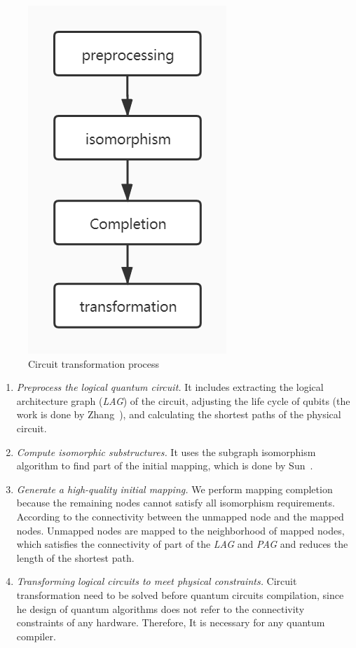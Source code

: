 \documentclass[runningheads]{llncs}
\begin{document}
\begin{figure}[h!] 
	\centering
	\includegraphics[scale=0.4]{uml.jpg}		 
	\caption{Circuit transformation process}
	\label{processing}	
	 \end{figure}
\begin{enumerate}
	\item \emph{ Preprocess the logical quantum circuit.} 
	It includes extracting the logical architecture graph (\textit{LAG}) of the circuit, adjusting the life cycle of qubits (the work is done by Zhang~\cite{2019Zhang}),  and calculating the shortest paths of the physical circuit.
	\item \emph{Compute isomorphic substructures.}
	It uses the subgraph isomorphism algorithm to find part of the initial mapping, which is done by Sun~\cite{Sun2020}.
	\item \emph{Generate a high-quality initial mapping.} We perform mapping completion because the remaining nodes cannot satisfy all isomorphism requirements. According to the connectivity between the unmapped node and the mapped nodes. Unmapped nodes are mapped to the neighborhood of mapped nodes, which satisfies the connectivity of part of the \textit{LAG} and \textit{PAG} and reduces the length of the shortest path.  
	\item \emph{Transforming logical circuits to meet physical constraints.}
	Circuit transformation need to be solved before quantum circuits compilation, since he design of quantum algorithms does not refer to the connectivity constraints of any hardware. Therefore, It is necessary for any quantum compiler.
\end{enumerate}
\end{document}
